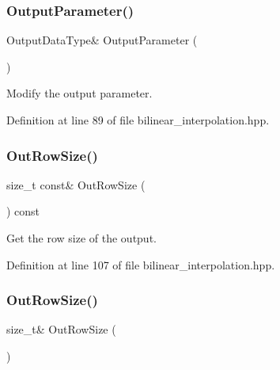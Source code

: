 \subsubsection{Output\+Parameter()\hspace{0.1cm}{\footnotesize\ttfamily [2/2]}}
{\footnotesize\ttfamily Output\+Data\+Type\& Output\+Parameter (\begin{DoxyParamCaption}{ }\end{DoxyParamCaption})\hspace{0.3cm}{\ttfamily [inline]}}



Modify the output parameter. 



Definition at line 89 of file bilinear\+\_\+interpolation.\+hpp.

\mbox{\label{classmlpack_1_1ann_1_1BilinearInterpolation_a0e4acfe53c207e4b3fba11525be06458}} 
\subsubsection{Out\+Row\+Size()\hspace{0.1cm}{\footnotesize\ttfamily [1/2]}}
{\footnotesize\ttfamily size\+\_\+t const\& Out\+Row\+Size (\begin{DoxyParamCaption}{ }\end{DoxyParamCaption}) const\hspace{0.3cm}{\ttfamily [inline]}}



Get the row size of the output. 



Definition at line 107 of file bilinear\+\_\+interpolation.\+hpp.

\mbox{\label{classmlpack_1_1ann_1_1BilinearInterpolation_a5061d94d050e5c78e8374801db4c2a9b}} 
\subsubsection{Out\+Row\+Size()\hspace{0.1cm}{\footnotesize\ttfamily [2/2]}}
{\footnotesize\ttfamily size\+\_\+t\& Out\+Row\+Size (\begin{DoxyParamCaption}{ }\end{DoxyParamCaption})\hspace{0.3cm}{\ttfamily [inline]}}




